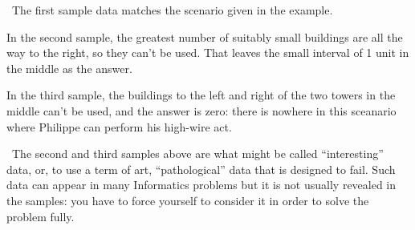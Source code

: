 \Explanation\ The first sample data matches the scenario given in the example.

In the second sample, the greatest number of suitably small buildings are all the way to
the right, so they can't be used. That leaves the small interval of 1 unit in the middle
as the answer.

In the third sample, the buildings to the left and right of the two towers in the middle
can't be used, and the answer is zero: there is nowhere in this sceanario where Philippe
can perform his high-wire act.

\Note\ The second and third samples above are what might be called ``interesting'' data,
or, to use a term of art, ``pathological'' data that is designed to fail. Such data can
appear in many Informatics problems but it is not usually revealed in the samples: you
have to force yourself to consider it in order to solve the problem fully.
